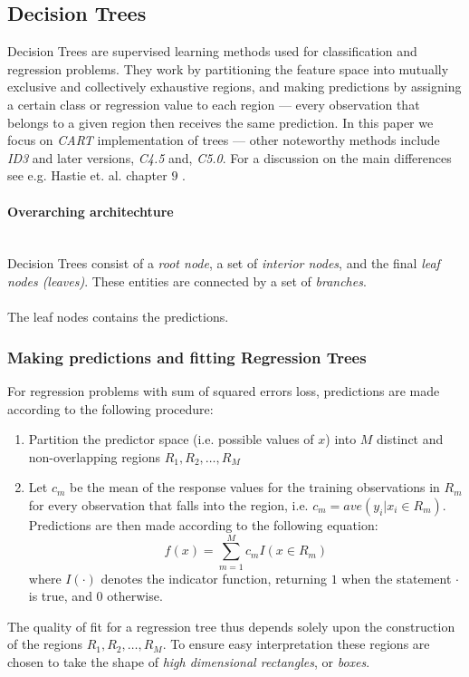 \documentclass[10pt, a4paper, twocolumn]{article}
\newcommand{\myparagraph}[1]{\paragraph{#1}\mbox{}\\}
\begin{document}
	\subsection{Decision Trees}
		Decision Trees are supervised learning methods used for classification and regression problems. They work by partitioning the feature space into mutually exclusive and collectively exhaustive regions, and making predictions by assigning a certain class or regression value to each region --- every observation that belongs to a given region then receives the same prediction. In this paper we focus on \emph{CART} implementation of trees --- other noteworthy methods include \emph{ID3} and later versions, \emph{C4.5} and, \emph{C5.0}. For a discussion on the main differences see e.g. Hastie et. al. chapter $9$ \cite{ElementsOfStatLearning}.
		
		\myparagraph{Overarching architechture}
		Decision Trees consist of a \emph{root node}, a set of \emph{interior nodes}, and the final \emph{leaf nodes (leaves)}. These entities are connected by a set of \emph{branches}.\\\\
		The leaf nodes contains the predictions.		
		
		\subsubsection{Making predictions and fitting Regression Trees}
			For regression problems with sum of squared errors loss, predictions are made according to the following procedure: \begin{enumerate}
				\item Partition the predictor space (i.e. possible values of $x$) into $M$ distinct and non-overlapping regions $R_1, R_2,\dots,R_M$
				\item Let $c_m$ be the mean of the response values for the training observations in $R_m$ for every observation that falls into the region, i.e. $c_m=ave(y_i|x_i\in R_m)$. Predictions are then made according to the following equation:
				$$f(x) = \sum_{m=1}^M c_m I(x\in R_m)$$
				where $I(\cdot)$ denotes the indicator function, returning $1$ when the statement $\cdot$ is true, and $0$ otherwise.
			\end{enumerate}
			The quality of fit for a regression tree thus depends solely upon the construction of the regions $R_1,R_2,\dots,R_M$. To ensure easy interpretation these regions are chosen to take the shape of \emph{high dimensional rectangles}, or \emph{boxes}.
			
\end{document}

